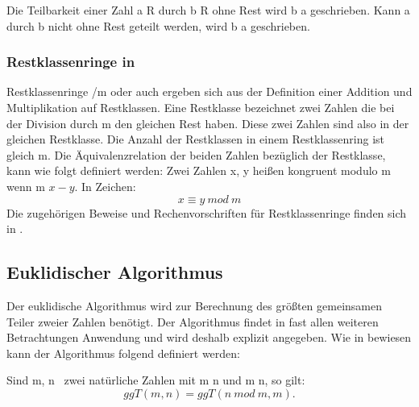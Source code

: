 			Die Teilbarkeit einer Zahl a \myin R durch b \myin R ohne Rest wird b \myTeiler a geschrieben. Kann a durch b nicht ohne Rest geteilt werden, wird b \myNichtTeiler a geschrieben.
		
		\subsubsection{Restklassenringe in }
			Restklassenringe \myMenge{Z}/m oder auch  ergeben sich aus der Definition einer Addition und Multiplikation auf Restklassen. Eine Restklasse bezeichnet zwei Zahlen \myin {} die bei der Division durch m \myin {} den gleichen Rest haben. Diese zwei Zahlen sind also in der gleichen Restklasse. Die Anzahl der Restklassen in einem Restklassenring ist gleich m. Die Äquivalenzrelation der beiden Zahlen bezüglich der Restklasse, kann wie folgt definiert werden:
			Zwei Zahlen x, y \myin {} heißen kongruent modulo m \myin {} wenn m \myTeiler $x-y$. In Zeichen:
			\begin{displaymath}
				x \equiv y~mod~m
			\end{displaymath}	
			Die zugehörigen Beweise und Rechenvorschriften für Restklassenringe finden sich in \cite{Algorithmische:Zahlentheorie}.
			
		\subsection{Euklidischer Algorithmus}
			Der euklidische Algorithmus wird zur Berechnung des größten gemeinsamen Teiler zweier Zahlen benötigt. Der Algorithmus findet in fast allen weiteren Betrachtungen Anwendung und wird deshalb explizit angegeben. Wie in \cite{Diskrete:Strukturen} bewiesen kann der Algorithmus folgend definiert werden:
			
			Sind m, n \myin {}\ zwei natürliche Zahlen mit m \myKleinerGleich n und m \myNichtTeiler n, so gilt:
			\begin{displaymath}
				ggT(m, n) = ggT(n~mod~m, m).
			\end{displaymath}
						
